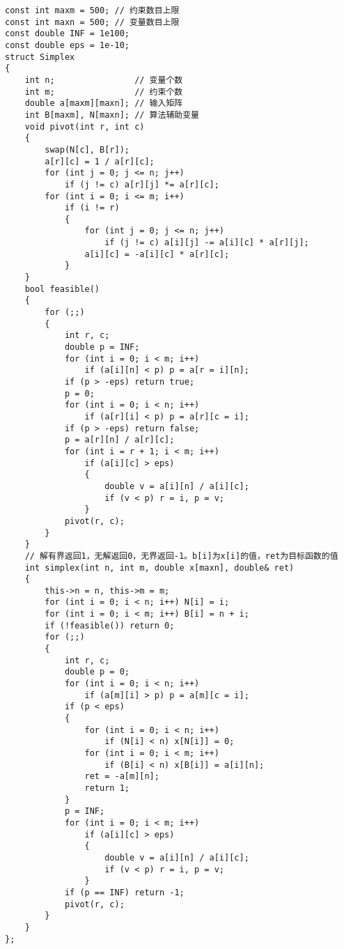 \documentclass[twoside]{article}
\begin{document}
\begin{lstlisting}
const int maxm = 500; // 约束数目上限
const int maxn = 500; // 变量数目上限
const double INF = 1e100;
const double eps = 1e-10;
struct Simplex
{
    int n;                // 变量个数
    int m;                // 约束个数
    double a[maxm][maxn]; // 输入矩阵
    int B[maxm], N[maxn]; // 算法辅助变量
    void pivot(int r, int c)
    {
        swap(N[c], B[r]);
        a[r][c] = 1 / a[r][c];
        for (int j = 0; j <= n; j++)
            if (j != c) a[r][j] *= a[r][c];
        for (int i = 0; i <= m; i++)
            if (i != r)
            {
                for (int j = 0; j <= n; j++)
                    if (j != c) a[i][j] -= a[i][c] * a[r][j];
                a[i][c] = -a[i][c] * a[r][c];
            }
    }
    bool feasible()
    {
        for (;;)
        {
            int r, c;
            double p = INF;
            for (int i = 0; i < m; i++)
                if (a[i][n] < p) p = a[r = i][n];
            if (p > -eps) return true;
            p = 0;
            for (int i = 0; i < n; i++)
                if (a[r][i] < p) p = a[r][c = i];
            if (p > -eps) return false;
            p = a[r][n] / a[r][c];
            for (int i = r + 1; i < m; i++)
                if (a[i][c] > eps)
                {
                    double v = a[i][n] / a[i][c];
                    if (v < p) r = i, p = v;
                }
            pivot(r, c);
        }
    }
    // 解有界返回1，无解返回0，无界返回-1。b[i]为x[i]的值，ret为目标函数的值
    int simplex(int n, int m, double x[maxn], double& ret)
    {
        this->n = n, this->m = m;
        for (int i = 0; i < n; i++) N[i] = i;
        for (int i = 0; i < m; i++) B[i] = n + i;
        if (!feasible()) return 0;
        for (;;)
        {
            int r, c;
            double p = 0;
            for (int i = 0; i < n; i++)
                if (a[m][i] > p) p = a[m][c = i];
            if (p < eps)
            {
                for (int i = 0; i < n; i++)
                    if (N[i] < n) x[N[i]] = 0;
                for (int i = 0; i < m; i++)
                    if (B[i] < n) x[B[i]] = a[i][n];
                ret = -a[m][n];
                return 1;
            }
            p = INF;
            for (int i = 0; i < m; i++)
                if (a[i][c] > eps)
                {
                    double v = a[i][n] / a[i][c];
                    if (v < p) r = i, p = v;
                }
            if (p == INF) return -1;
            pivot(r, c);
        }
    }
};\end{lstlisting}
\end{document}
